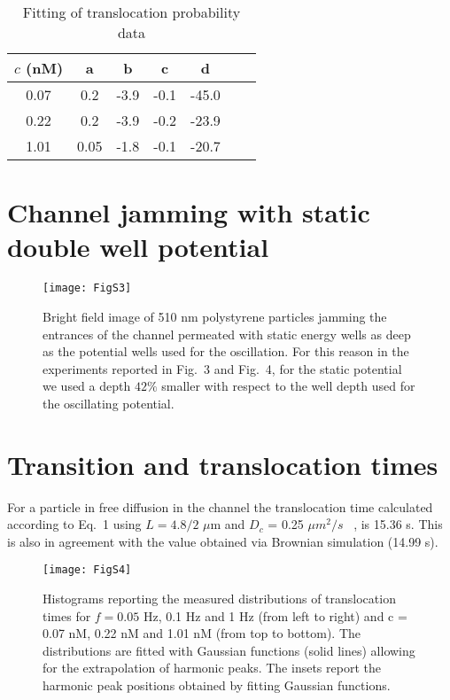 \documentclass[
 reprint,
 aps, showkeys, showpacs
]{revtex4-1}
\begin{document}
\begin{table}[H]
	\caption{Fitting of translocation probability data}
	\begin{ruledtabular}
		\begin{tabular}{ccccccc}
			$c$ (nM)& a& b& c&  d 
			\\
			\hline
			0.07& 0.2& -3.9& -0.1& -45.0\\
			0.22& 0.2& -3.9& -0.2& -23.9\\
			1.01& 0.05& -1.8& -0.1& -20.7\\
		\end{tabular}
	\end{ruledtabular}
\end{table}

\section{Channel jamming with static double well potential}\label{appendix4}

\begin{figure}[H]
	\centering
	\texttt{[image: FigS3]}
	\caption{\label{S2} Bright field image of 510 nm polystyrene particles jamming the entrances of the channel permeated with static energy wells as deep as the potential wells used for the oscillation. For this reason in the experiments reported in Fig.~3 and Fig.~4, for the static potential we used a depth $42\%$ smaller with respect to the well depth used for the oscillating potential.}
\end{figure}

\section{Transition and translocation times}\label{appendix5}
For a particle in free diffusion in the channel the translocation time calculated according to Eq.~1 using $L=4.8/2$ $\mu$m and $D_c$ = 0.25 $\mu m^2/s$~\cite{Dettmer2014b} , is 15.36 s. This is also in agreement with the value obtained via Brownian simulation (14.99 s).

\begin{figure}[H]
	\texttt{[image: FigS4]}
	\caption{\label{S7} Histograms reporting the measured distributions of translocation times for $f = 0.05$ Hz, 0.1 Hz and 1 Hz (from left to right) and c = 0.07 nM, 0.22 nM and 1.01 nM (from top to bottom). The distributions are fitted with Gaussian functions (solid lines) allowing for the extrapolation of harmonic peaks. The insets report the harmonic peak positions obtained by fitting Gaussian functions.  }
\end{figure}
\end{document}

